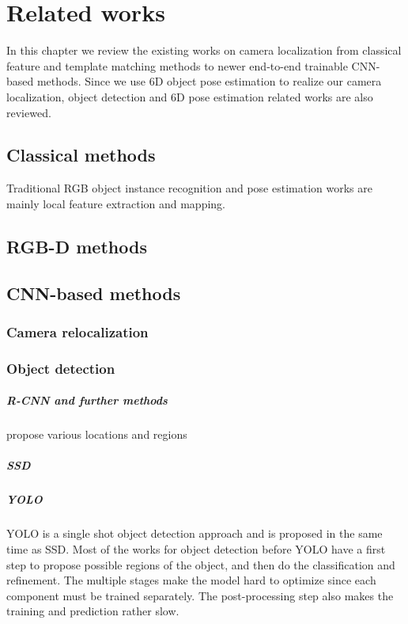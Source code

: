 \chapter{Related works}

In this chapter we review the existing works on camera localization from classical feature and template matching methods to newer end-to-end trainable CNN-based methods. Since we use 6D object pose estimation to realize our camera localization, object detection and 6D pose estimation related works are also reviewed.

\section{Classical methods}

Traditional RGB object instance recognition and pose estimation works are mainly local feature extraction and mapping.

\section{RGB-D methods}


\section{CNN-based methods}

\subsection{Camera relocalization}

\subsection{Object detection}

\paragraph{R-CNN and further methods}
propose various locations and regions 

\paragraph{SSD}

\paragraph{YOLO}
YOLO is a single shot object detection approach and is proposed in the same time as SSD. Most of the works for object detection before YOLO have a first step to propose possible regions of the object, and then do the classification and refinement. The multiple stages make the model hard to optimize since each component must be trained separately. The post-processing step also makes the training and prediction rather slow.


